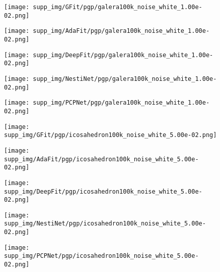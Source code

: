 \documentclass[runningheads]{llncs}
\begin{document}
\begin{figure*}
\begin{subfigure}{0.15\linewidth}
		\centering
		\texttt{[image: supp\_img/GFit/pgp/galera100k\_noise\_white\_1.00e-02.png]}
\end{subfigure}
	\hspace{0.1cm}
	\begin{subfigure}{0.15\linewidth}
		\centering
		\texttt{[image: supp\_img/AdaFit/pgp/galera100k\_noise\_white\_1.00e-02.png]}
\end{subfigure}
	\hspace{0.1cm}
	\begin{subfigure}{0.17\linewidth}
		\centering
		\texttt{[image: supp\_img/DeepFit/pgp/galera100k\_noise\_white\_1.00e-02.png]}
\end{subfigure}
	\hspace{0.1cm}
	\begin{subfigure}{0.17\linewidth}
		\centering
		\texttt{[image: supp\_img/NestiNet/pgp/galera100k\_noise\_white\_1.00e-02.png]}
\end{subfigure}
	\hspace{0.1cm}
	\begin{subfigure}{0.17\linewidth}
		\centering
		\texttt{[image: supp\_img/PCPNet/pgp/galera100k\_noise\_white\_1.00e-02.png]}
\end{subfigure}
	
\begin{subfigure}{0.15\linewidth}
		\centering
		\texttt{[image: supp\_img/GFit/pgp/icosahedron100k\_noise\_white\_5.00e-02.png]}
\end{subfigure}
	\hspace{0.1cm}
	\begin{subfigure}{0.15\linewidth}
		\centering
		\texttt{[image: supp\_img/AdaFit/pgp/icosahedron100k\_noise\_white\_5.00e-02.png]}
\end{subfigure}
	\hspace{0.1cm}
	\begin{subfigure}{0.17\linewidth}
		\centering
		\texttt{[image: supp\_img/DeepFit/pgp/icosahedron100k\_noise\_white\_5.00e-02.png]}
\end{subfigure}
	\hspace{0.1cm}
	\begin{subfigure}{0.17\linewidth}
		\centering
		\texttt{[image: supp\_img/NestiNet/pgp/icosahedron100k\_noise\_white\_5.00e-02.png]}
\end{subfigure}
	\hspace{0.1cm}
	\begin{subfigure}{0.17\linewidth}
		\centering
		\texttt{[image: supp\_img/PCPNet/pgp/icosahedron100k\_noise\_white\_5.00e-02.png]}
\end{subfigure}
	

\end{figure*}
\end{document}
